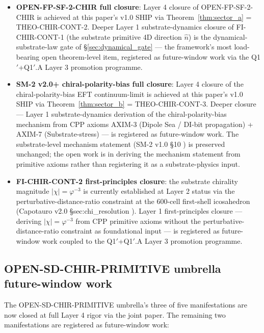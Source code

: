 \documentclass[11pt,letterpaper]{article}
\begin{document}
\begin{itemize}[leftmargin=*]
\item \textbf{OPEN-FP-SF-2-CHIR full closure}: Layer 4 closure of OPEN-FP-SF-2-CHIR is achieved at this paper's v1.0 SHIP via Theorem~\ref{thm:sector_a} = THEO-CHIR-CONT-2. Deeper Layer 1 substrate-dynamics closure of FI-CHIR-CONT-1 (the substrate primitive 4D direction $\hat{n}$) is the dynamical-substrate-law gate of §\ref{sec:dynamical_gate} — the framework's most load-bearing open theorem-level item, registered as future-window work via the Q1$'$+Q1$'$.A Layer 3 promotion programme.

\item \textbf{SM-2 v2.0+ chiral-polarity-bias full closure}: Layer 4 closure of the chiral-polarity-bias EFT continuum-limit is achieved at this paper's v1.0 SHIP via Theorem~\ref{thm:sector_b} = THEO-CHIR-CONT-3. Deeper closure --- Layer 1 substrate-dynamics derivation of the chiral-polarity-bias mechanism from CPP axioms AXIM-3 (Dipole Sea / DI-bit propagation) + AXIM-7 (Substrate-stress) \cite{AxiomDocument} --- is registered as future-window work. The substrate-level mechanism statement (SM-2 v1.0 §10 \cite{SM2v1}) is preserved unchanged; the open work is in deriving the mechanism statement from primitive axioms rather than registering it as a substrate-physics input.

\item \textbf{FI-CHIR-CONT-2 first-principles closure}: the substrate chirality magnitude $|\chi| = \varphi^{-3}$ is currently established at Layer 2 status via the perturbative-distance-ratio constraint at the 600-cell first-shell icosahedron (Capotauro v2.0 §sec:chi\_resolution \cite{Capotauro}). Layer 1 first-principles closure --- deriving $|\chi| = \varphi^{-3}$ from CPP primitive axioms without the perturbative-distance-ratio constraint as foundational input --- is registered as future-window work coupled to the Q1$'$+Q1$'$.A Layer 3 promotion programme.
\end{itemize}

\subsection{OPEN-SD-CHIR-PRIMITIVE umbrella future-window work}
\label{sec:umbrella_future_work}

The OPEN-SD-CHIR-PRIMITIVE umbrella's three of five manifestations are now closed at full Layer 4 rigor via the joint paper. The remaining two manifestations are registered as future-window work:
\end{document}
